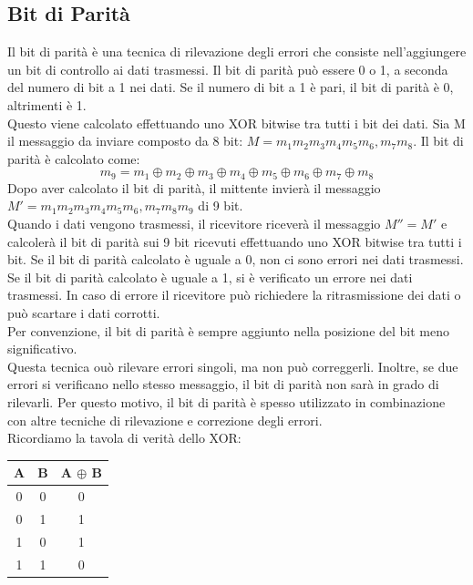 \documentclass[12pt]{report}
\begin{document}
	\subsection{Bit di Parità}
	Il bit di parità è una tecnica di rilevazione degli errori che consiste nell'aggiungere un bit di controllo ai dati trasmessi. Il bit di parità può essere 0 o 1, a seconda del numero di bit a 1 nei dati. Se il numero di bit a 1 è pari, il bit di parità è 0, altrimenti è 1.
	\vspace{\baselineskip}\\
	Questo viene calcolato effettuando uno XOR bitwise tra tutti i bit dei dati. Sia M il messaggio da inviare composto da 8 bit: $M = m_1m_2m_3m_4m_5m_6,m_7m_8$. Il bit di parità è calcolato come:
	\[
		m_9 = m_1 \oplus m_2 \oplus m_3 \oplus m_4 \oplus m_5 \oplus m_6 \oplus m_7 \oplus m_8
	\]
	Dopo aver calcolato il bit di parità, il mittente invierà il messaggio $M' = m_1m_2m_3m_4m_5m_6,m_7m_8m_9$ di 9 bit. 
	\vspace{\baselineskip}\\
	Quando i dati vengono trasmessi, il ricevitore riceverà il messaggio $M'' = M'$ e calcolerà il bit di parità sui 9 bit ricevuti effettuando uno XOR bitwise tra tutti i bit. Se il bit di parità calcolato è uguale a 0, non ci sono errori nei dati trasmessi. Se il bit di parità calcolato è uguale a 1, si è verificato un errore nei dati trasmessi. In caso di errore il ricevitore può richiedere la ritrasmissione dei dati o può scartare i dati corrotti.
	\vspace{\baselineskip}\\
	Per convenzione, il bit di parità è sempre aggiunto nella posizione del bit meno significativo.
	\vspace{\baselineskip}\\
	Questa tecnica ouò rilevare errori singoli, ma non può correggerli. Inoltre, se due errori si verificano nello stesso messaggio, il bit di parità non sarà in grado di rilevarli. Per questo motivo, il bit di parità è spesso utilizzato in combinazione con altre tecniche di rilevazione e correzione degli errori.
	\vspace{\baselineskip}\\
	Ricordiamo la tavola di verità dello XOR:
	\begin{center}
		\begin{tabular}{|c|c|c|}
			\hline
			A & B & A $\oplus$ B \\
			\hline
			0 & 0 & 0 \\
			0 & 1 & 1 \\
			1 & 0 & 1 \\
			1 & 1 & 0 \\
			\hline
		\end{tabular}
	\end{center}
\end{document}
